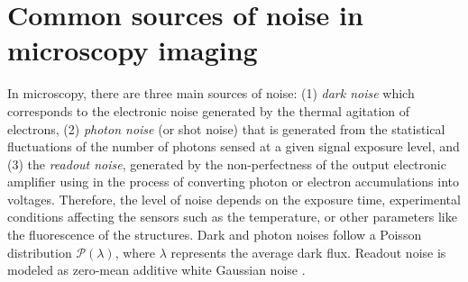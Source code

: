 \documentclass{article}
\begin{document}
\section{Common sources of noise in microscopy imaging}
In microscopy, there are three main sources of noise: (1)
\emph{dark noise} which corresponds to the electronic noise generated
by the thermal agitation of electrons, (2) \emph{photon noise} (or
shot noise) that is generated from the statistical fluctuations of the
number of photons sensed at a given signal exposure level, and (3) the
\emph{readout noise}, generated by the non-perfectness of the output
electronic amplifier using in the process of converting photon or
electron accumulations into voltages. Therefore, the level of noise
depends on the exposure time, experimental conditions affecting the
sensors such as the temperature, or other parameters like the
fluorescence of the structures. Dark and photon noises follow a Poisson
distribution $\mathcal{P}(\lambda)$, where $\lambda$ represents the
average dark flux. Readout noise is modeled as zero-mean additive
white Gaussian noise \cite{meiniel2018denoising,zhou2020wirtinger}.

\end{document}
